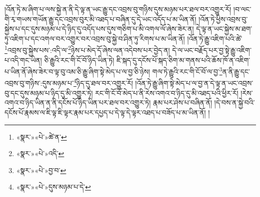 །འོན་ཏེ་མ་ཞིག་པ་ལས་སྐྱེ་ན་ནི་དེ་ལྟ་ན་ཡང་རྒྱུ་དང་འབྲས་བུ་གཉིས་དུས་མཉམ་པར་ཐལ་བར་འགྱུར་རོ། །བ་ལང་གི་རྭ་གཡས་གཡོན་རྒྱུ་དང་འབྲས་བུར་མི་འཐད་པ་བཞིན་དུ་དེ་ཡང་འདོད་པ་མ་ཡིན་ནོ། །འོན་ཏེ་ཕྱིས་འབྲས་བུ་སྐྱེས་པ་དང་དུས་མཉམ་པ་དེ་ཉིད་དུ་འདོད་པས་དུས་གཅིག་པ་མི་འགལ་ལོ་ཞེས་ཟེར་ན། དེ་ལྟ་ན་ཡང་སྐྱེས་མ་ཐག་ཏུ་འཇིག་པ་དང་འགལ་བར་འགྱུར་བར་འབྲས་བུ་སྐྱེ་བ་ཤིན་ཏུ་རིགས་པ་མ་ཡིན་ནོ། །འོན་ཏེ་རྒྱུ་འཇིག་པའི་ཚེ་\footnote{«སྣར་»«པེ་»ཚེ་ན་}འབྲས་བུ་སྐྱེས་པས་:འདི་ལ་\footnote{«སྣར་»«པེ་»འདི་}ཉེས་པ་མེད་དོ་ཞེས་ལན་འདེབས་པར་བྱེད་ན། དེ་ལ་ཡང་བརྗོད་པར་བྱ་སྟེ་རྒྱུ་འཇིག་པ་འདི་གང་ཡིན། ཅི་རྒྱུའི་རང་གི་ངོ་བོ་ཉིད་ཡིན་ཏེ། ཇི་སྐད་དུ་དངོས་པོ་སྐད་ཅིག་མ་གནས་པའི་ཆོས་ཁོ་ན་འཇིག་པ་ཡིན་ནོ་ཞེས་ཟེར་བ་ལྟ་བུ་འམ་ཅི་རྒྱུ་ཞིག་སྟེ་མེད་པ་ལ་བྱ་ཅི་ཉེས། གལ་ཏེ་རྒྱུའི་རང་གི་ངོ་བོ་ལ་བྱ་\footnote{«སྣར་»«པེ་»བྱ་བ་}ན་ནི་རྒྱུ་དང་འབྲས་བུ་གཉིས་:དུས་མཉམ་པ་\footnote{«སྣར་»«པེ་»དུས་མཉམ་པ་དེ་}ཉིད་དུ་ཐལ་བར་འགྱུར་རོ། །འོན་ཏེ་རྒྱུ་ཞིག་སྟེ་མེད་པ་ལ་བྱ་ན་དེ་ལྟ་ན་ཡང་འབྲས་བུ་དང་དུས་མཉམ་པ་ཉིད་དུ་མི་འགྱུར་ཏེ། རང་གི་ངོ་བོ་མེད་པ་ནི་རེས་འགའ་བ་ཉིད་དུ་མི་འཐད་པའི་ཕྱིར་རོ། །རེས་འགའ་བ་ཉིད་ཡིན་ན་ནི་དངོས་པོ་ཉིད་ཡིན་པར་ཐལ་བར་འགྱུར་ཏེ། རྣམ་པར་ཤེས་པ་བཞིན་ནོ། །དེ་བས་ན་སྐྱེ་བའི་དངོས་པོ་རྣམས་ལ་ཇི་ལྟ་ཇི་ལྟར་རྣམ་པར་དཔྱད་པ་དེ་ལྟ་དེ་ལྟར་འཐད་པ་བཟོད་པ་མ་ཡིན་ནོ། །
